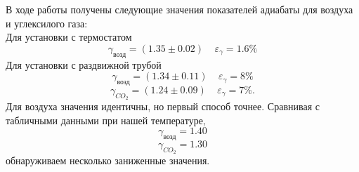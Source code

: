 \documentclass[12pt,a4paper]{article}
\begin{document}
В ходе работы получены следующие значения показателей адиабаты для воздуха и углексилого газа: \\ Для установки с термостатом
    $$\gamma_{\text{возд}}=(1.35 \pm 0.02) \;\;\;\; \varepsilon_{\gamma}=1.6\%$$
         Для установки с раздвижной трубой
    $$\gamma_{\text{возд}}=(1.34 \pm 0.11) \;\;\;\; \varepsilon_{\gamma}=8\%$$
    $$\gamma_{CO_2}=(1.24 \pm 0.09) \;\;\;\; \varepsilon_{\gamma}=7\%.$$
    Для воздуха значения идентичны, но первый способ точнее. Сравнивая с табличными данными при нашей температуре,
    $$\gamma_{\text{возд}}=1.40 $$
    $$\gamma_{CO_2}=1.30 $$
    обнаруживаем несколько заниженные значения.
\end{document}
